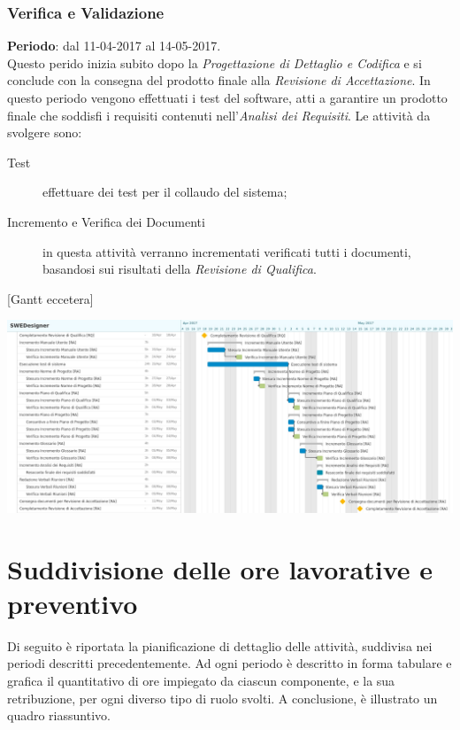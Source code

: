 	\subsubsection{Verifica e Validazione} \label{sec:VV}

	\textbf{Periodo}: dal 11-04-2017 al 14-05-2017.
	\\ Questo perido inizia subito dopo la \emph{Progettazione di Dettaglio e Codifica} e si conclude con la consegna del prodotto finale alla \emph{Revisione di Accettazione}. In questo periodo vengono effettuati i test del software, atti a garantire un prodotto finale che soddisfi i requisiti contenuti nell'\emph{Analisi dei Requisiti}. Le attività da svolgere sono:
	\begin{description}
		\item[Test] effettuare dei test per il collaudo del sistema;
		\item[Incremento e Verifica dei Documenti] in questa attività verranno incrementati verificati tutti i documenti, basandosi sui risultati della \emph{Revisione di Qualifica}.
	\end{description}
	[Gantt eccetera]	
	
	{\includegraphics[width=15cm]{img/ganttva.png}\par}

	
\section{Suddivisione delle ore lavorative e preventivo}
Di seguito è riportata la pianificazione di dettaglio delle attività, suddivisa nei periodi descritti precedentemente. Ad ogni periodo è descritto in forma tabulare e grafica il quantitativo di ore impiegato da ciascun componente, e la sua retribuzione, per ogni diverso tipo di ruolo svolti.
A conclusione, è illustrato un quadro riassuntivo.


\newcommand{\roww}[7]{
	#1 & #2 & #3 & #4 & #5 & #6 & #7
}

